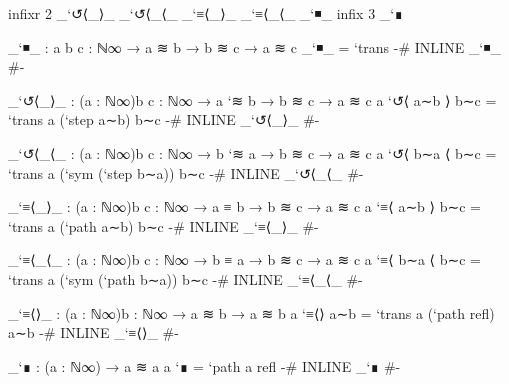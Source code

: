 \begin{code}
infixr 2 _`↺⟨_⟩_ _`↺⟨_⟨_ _`≡⟨_⟩_ _`≡⟨_⟨_ _`◾_
infix  3 _`∎

_`◾_ : {a b c : ℕ∞} → a ≋ b → b ≋ c → a ≋ c
_`◾_ = `trans
{-# INLINE _`◾_ #-}

_`↺⟨_⟩_ : (a : ℕ∞){b c : ℕ∞} → a `≋ b → b ≋ c → a ≋ c
a `↺⟨ a∼b ⟩ b∼c = `trans {a} (`step a∼b) b∼c
{-# INLINE _`↺⟨_⟩_ #-}

_`↺⟨_⟨_ : (a : ℕ∞){b c : ℕ∞} → b `≋ a → b ≋ c → a ≋ c
a `↺⟨ b∼a ⟨ b∼c = `trans {a} (`sym (`step b∼a)) b∼c
{-# INLINE _`↺⟨_⟨_ #-}

_`≡⟨_⟩_ : (a : ℕ∞){b c : ℕ∞} → a ≡ b → b ≋ c → a ≋ c
a `≡⟨ a∼b ⟩ b∼c = `trans {a} (`path a∼b) b∼c
{-# INLINE _`≡⟨_⟩_ #-}

_`≡⟨_⟨_ : (a : ℕ∞){b c : ℕ∞} → b ≡ a → b ≋ c → a ≋ c
a `≡⟨ b∼a ⟨ b∼c = `trans {a} (`sym (`path b∼a)) b∼c
{-# INLINE _`≡⟨_⟨_ #-}

_`≡⟨⟩_ : (a : ℕ∞){b : ℕ∞} → a ≋ b → a ≋ b
a `≡⟨⟩ a∼b = `trans {a} (`path refl) a∼b
{-# INLINE _`≡⟨⟩_ #-}

_`∎ : (a : ℕ∞) → a ≋ a
a `∎ = `path  {a} refl
{-# INLINE _`∎ #-}
\end{code}
